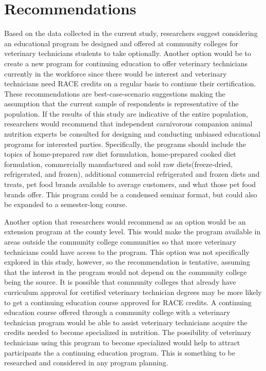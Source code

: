 \section{Recommendations}
Based on the data collected in the current study, researchers suggest considering an educational program be designed and offered at community colleges for veterinary technicians students to take optionally. Another option would be to create a new program for continuing education to offer veterinary technicians currently in the workforce since there would be interest and veterinary technicians need RACE credits on a regular basis to continue their certification. These recommendations are best-case-scenario suggestions making the assumption that the current sample of respondents is representative of the population. If the results of this study are indicative of the entire population, researchers would recommend that independent carnivorous companion animal nutrition experts be consulted for designing and conducting unbiased educational programs for interested parties. Specifically, the programs should include the topics of home-prepared raw diet formulation, home-prepared cooked diet formulation, commercially manufactured and sold raw diets(freeze-dried, refrigerated, and frozen), additional commercial refrigerated and frozen diets and treats, pet food brands available to average customers, and what those pet food brands offer. This program could be a condensed seminar format, but could also be expanded to a semester-long course.
\par Another option that researchers would recommend as an option would be an extension program at the county level. This would make the program available in areas outside the community college communities so that more veterinary technicians could have access to the program. This option was not specifically explored in this study, however, so the recommendation is tentative, assuming that the interest in the program would not depend on the community college being the source. It is possible that community colleges that already have curriculum approval for certified veterinary technician degrees may be more likely to get a continuing education course approved for RACE credits. A continuing education course offered through a community college with a veterinary technician program would be able to assist veterinary technicians acquire the credits needed to become specialized in nutrition\citep{avnt}. The possibility of veterinary technicians using this program to become specialized would help to attract participants the a continuing education program. This is something to be researched and considered in any program planning.
